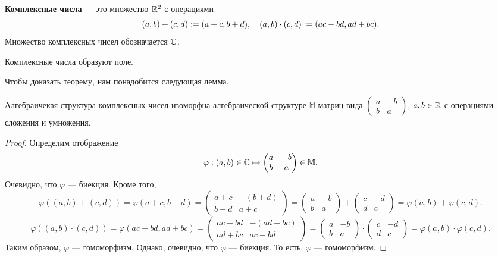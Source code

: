 \begin{definition}
    \textbf{Комплексные числа} --- это множество $\mathbb{R}^2$ с операциями
    $$
    (a, b) + (c, d) \vcentcolon = (a + c, b + d),\quad (a, b) \cdot (c, d) \vcentcolon= (ac - bd, ad + bc).
    $$
    Множество комплексных чисел обозначается $\mathbb{C}$.
\end{definition}

\begin{theorem}
    Комплексные числа образуют поле.
\end{theorem}

Чтобы доказать теорему, нам понадобится следующая лемма.

\begin{lemma}
    Алгебраичекая структура комплексных чисел изоморфна алгебраической структуре $\mathbb{M}$ матриц вида
    $
    \begin{pmatrix}
        a & -b\\
        b & a
    \end{pmatrix}
    $, $a, b \in \mathbb{R}$ с операциями сложения и умножения.
\end{lemma}

\begin{proof}
    Определим отображение
    $$
    \varphi: (a, b) \in \mathbb{C} \mapsto
    \begin{pmatrix}
        a & -b\\
        b & a
    \end{pmatrix} \in \mathbb{M}.
    $$
    Очевидно, что $\varphi$ --- биекция. Кроме того,
    $$
        \varphi((a, b) + (c, d)) = \varphi(a + c, b + d) =
        \begin{pmatrix}
            a + c & -(b + d)\\
            b + d & a + c
        \end{pmatrix} = 
        \begin{pmatrix}
            a & -b\\
            b & a
        \end{pmatrix} +
        \begin{pmatrix}
            c & -d\\
            d & c
        \end{pmatrix} = \varphi(a, b) + \varphi(c, d).
    $$
    $$
        \varphi((a, b) \cdot (c, d)) = \varphi(ac - bd, ad + bc) =
        \begin{pmatrix}
            ac - bd & -(ad + bc)\\
            ad + bc & ac - bd
        \end{pmatrix} = 
        \begin{pmatrix}
            a & -b\\
            b & a
        \end{pmatrix} \cdot
        \begin{pmatrix}
            c & -d\\
            d & c
        \end{pmatrix} = \varphi(a, b) \cdot \varphi(c, d).
    $$
    Таким образом, $\varphi$ --- гомоморфизм. Однако, очевидно, что $\varphi$ --- биекция. То есть, $\varphi$ --- гомоморфизм.
\end{proof}

